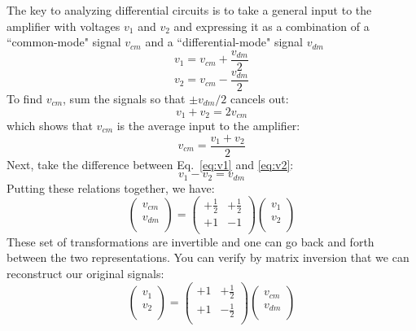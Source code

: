 The key to analyzing differential circuits is to take a general input to the amplifier with voltages $v_1$ and $v_2$ and expressing it as a combination of a ``common-mode" signal $v_{cm}$ and a ``differential-mode" signal $v_{dm}$
%
\begin{equation}
	v_1 = v_{cm} + \frac{v_{dm}}{2}
	\label{eq:v1}
\end{equation}
\begin{equation}
	v_2 = v_{cm} - \frac{v_{dm}}{2}
	\label{eq:v2}
\end{equation}
To find $v_{cm}$, sum the signals so that $\pm v_{dm}/2$ cancels out:
%
\begin{equation}
	v_1 + v_2 = 2 v_{cm}
\end{equation}
which shows that $v_{cm}$ is the average input to the amplifier:
\begin{equation}
	v_{cm} = \frac{v_1 + v_2}{2}
\end{equation}
%
Next, take the difference between Eq.~\ref{eq:v1} and \ref{eq:v2}:
% 
\begin{equation}
	v_1 - v_2 = v_{dm} 
\end{equation}
%
Putting these relations together, we have:
%
\begin{equation}
	\begin{pmatrix}
		v_{cm} \\
		v_{dm} \\
	\end{pmatrix} =
	\begin{pmatrix}
		+\frac{1}{2} & +\frac{1}{2} \\
		+1 & -1  \\
	\end{pmatrix} 
	\begin{pmatrix}
		v_{1} \\
		v_{2} \\
	\end{pmatrix} 
\end{equation}  
%
These set of transformations are invertible and one can go back and forth between the two representations.  You can verify by matrix inversion that we can reconstruct our original signals:
%
\begin{equation}
	\begin{pmatrix}
		v_{1} \\
		v_{2} \\
	\end{pmatrix} =
	\begin{pmatrix}
		+1 & +\frac{1}{2} \\
		+1 & -\frac{1}{2}  \\
	\end{pmatrix} 
	\begin{pmatrix}
		v_{cm} \\
		v_{dm} \\
	\end{pmatrix} 
\end{equation}  

